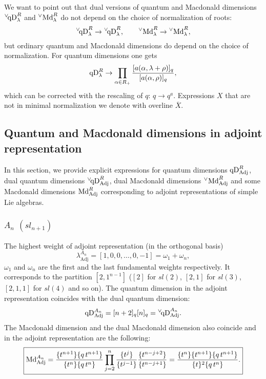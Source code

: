 \documentclass{article}
\def\MD{\hbox{Md}}%
\def\qDv{{^\vee\!\hbox{qD}}}
\def\qD{\hbox{qD}}
\def\MD{\hbox{Md}}%
\def\MDv{{^\vee\hbox{Md}}}
\def\qDv{{^\vee\!\hbox{qD}}}
\def\qD{\hbox{qD}}
\def\Adj{\text{Adj}}
\begin{document}
We want to point out that dual versions of quantum and Macdonald dimensions $\qDv_{\lambda}^{R}$ and $\MDv_{\lambda}^{R}$ do not depend on the choice of normalization of roots:
\begin{equation}
    \qDv_{\lambda}^{R} \rightarrow \qDv_{\lambda}^{R}, \quad\quad \MDv_{\lambda}^{R} \rightarrow \MDv_{\lambda}^{R},
\end{equation}
but ordinary quantum and Macdonald dimensions do depend on the choice of normalization. For quantum dimensions one gets
\begin{equation}
    \qD_{\lambda}^{R} \rightarrow \prod_{\alpha\in R_+} \frac{[a(\alpha,\lambda+\rho)]_q}{[a(\alpha,\rho)]_q},
\end{equation}
which can be corrected with the rescaling of $q$: $ q \rightarrow q^a$. Expressions $X$ that are not in minimal normalization we denote with overline $\overline{X}$.



\subsection{Quantum and Macdonald dimensions in adjoint representation}
In this section, we provide explicit expressions for quantum dimensions $\qD_{\Adj}^{R}$, dual quantum dimensions $\qDv_{\Adj}^{R}$, dual Macdonald dimensions $\MDv_{\Adj}^{R}$ and some Macdonald dimensions $\MD_{\Adj}^{R}$ corresponding to adjoint representations of simple Lie algebras.

\subsubsection{$A_n$ $(sl_{n+1})$}
The highest weight of adjoint representation (in the orthogonal basis)
\begin{equation}
    \lambda_{\Adj}^{A_n} = [1,0,0,\dots,0,-1] =  \omega_1+\omega_n,
\end{equation}
 $\omega_1$ and  $\omega_n$ are the first and the last fundamental weights respectively.
It corresponds to the partition $[2,1^{n-1}]$ ($[2]$ for $sl(2)$, $[2,1]$ for $sl(3)$, $[2,1,1]$ for $sl(4)$ and so on).
\noindent
The quantum dimension in the adjoint representation coincides with the dual quantum dimension:
\begin{equation}
    \qD_{\Adj}^{A_n} = [n+2]_q [n]_q = \qDv_{\Adj}^{A_n}.
\end{equation}
The Macdonald dimension and the dual Macdonald dimension also coincide and in the adjoint representation are the following:
\begin{equation}
\boxed{
    \MD_{\Adj}^{A_n} =  \frac{\{t^{n+1}\}\{q\,t^{n+1}\}}{\{t^{n}\}\{q\,t^{n}\}} \prod_{j=2}^{n} \frac{\{t^j\}}{\{t^{j-1}\}} \frac{\{t^{n-j+2}\}}{\{t^{n-j+1}\}}= \frac{\{t^n\}\{t^{n+1}\}\{q\,t^{n+1}\}}{\{t\}^2\{q\,t^{n}\}}.}
    \label{MacDimA}
\end{equation}
\end{document}
